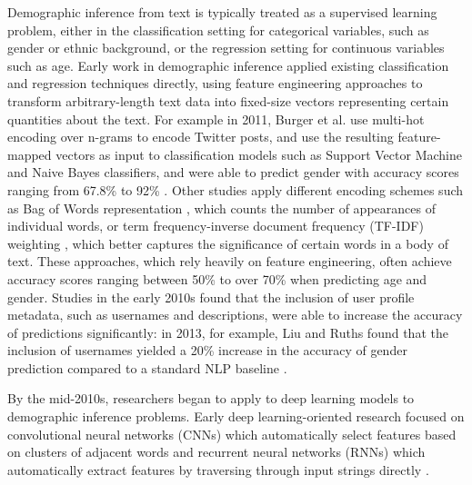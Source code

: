 \documentclass{report}
\begin{document}
Demographic inference from text is typically treated as a supervised learning problem, either in the classification setting for categorical variables, such as gender or ethnic background, or the regression setting for continuous variables such as age. Early work in demographic inference applied existing classification and regression techniques directly, using feature engineering approaches to transform arbitrary-length text data into fixed-size vectors representing certain quantities about the text. For example in 2011, Burger et al. use multi-hot encoding over n-grams to encode Twitter posts, and use the resulting feature-mapped vectors as input to classification models such as Support Vector Machine and Naive Bayes classifiers, and were able to predict gender with accuracy scores ranging from 67.8\% to 92\% \cite{burger-etal-2011-discriminating}. Other studies apply different encoding schemes such as Bag of Words representation \cite{Chen2021ComparativeDemographicAttribute}, which counts the number of appearances of individual words, or term frequency-inverse document frequency (TF-IDF) weighting \cite{wang-etal-2016-improving}, which better captures the significance of certain words in a body of text. These approaches, which rely heavily on feature engineering, often achieve accuracy scores ranging between 50\% to over 70\% when predicting age and gender. Studies in the early 2010s found that the inclusion of user profile metadata, such as usernames and descriptions, were able to increase the accuracy of predictions significantly: in 2013, for example, Liu and Ruths found that the inclusion of usernames yielded a 20\% increase in the accuracy of gender prediction compared to a standard NLP baseline \cite{liu-2013-whats-in-a-name}.

By the mid-2010s, researchers began to apply to deep learning models to demographic inference problems. Early deep learning-oriented research focused on convolutional neural networks (CNNs) which automatically select features based on clusters of adjacent words \cite{Ruder-2016-cnns-for-text-classification} and recurrent neural networks (RNNs) which automatically extract features by traversing through input strings directly \cite{kim-etal-2017-demographic}.
\end{document}
